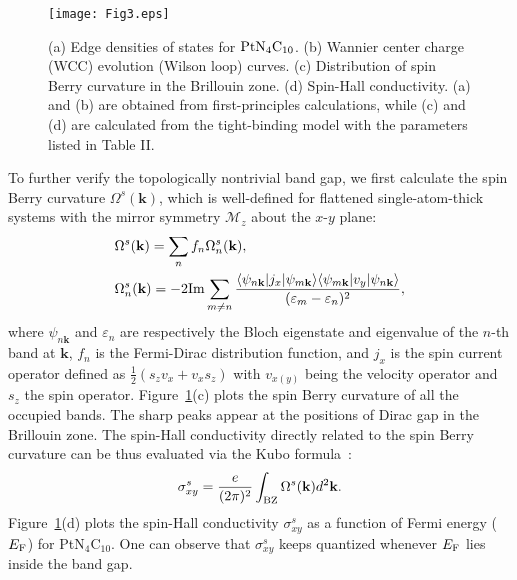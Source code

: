 \documentclass[aps,prl,twocolumn,showpacs,superscriptaddress]{revtex4-1}
\begin{document}
\begin{figure}[tb]
	\texttt{[image: Fig3.eps]}
	\caption{(a) Edge densities of states for ${\rm PtN_4C_{10}}$. (b) Wannier center charge (WCC) evolution (Wilson loop) curves. (c) Distribution of spin Berry curvature in the Brillouin zone. (d) Spin-Hall conductivity. (a) and (b) are obtained from first-principles calculations, while (c) and (d) are calculated from the tight-binding model with the parameters listed in Table II.}
	\label{fig3}
\end{figure}

To further verify the topologically nontrivial band gap, we first calculate the spin Berry curvature $\Omega^s(\textbf{k})$, which is well-defined for flattened single-atom-thick systems with the mirror symmetry $\mathcal{M}_z$ about the $x$-$y$ plane:
\begin{eqnarray}
\begin{aligned}
  &\Omega^s(\textbf{k})=\sum_n f_n\Omega^s_n(\textbf{k}),\\
  &\Omega^s_n(\textbf{k})=-2{\rm Im}\sum_{m\neq n}\frac{\langle{\psi_{n\textbf{k}}}|j_x|\psi_{m\textbf{k}}\rangle{\langle{\psi_{m\textbf{k}}}|v_y|\psi_{n\textbf{k}}\rangle}}{(\varepsilon_m-\varepsilon_n)^2},
  \end{aligned}
\end{eqnarray}
where $\psi_{n\textbf{k}}$ and $\varepsilon_n$ are respectively the Bloch eigenstate and eigenvalue of the $n$-th band at $\textbf{k}$, $f_n$ is the Fermi-Dirac distribution function, and $j_x$ is the spin current operator defined as $\frac12(s_zv_x+v_xs_z)$ with $v_{x(y)}$ being the velocity operator and $s_z$ the spin operator. Figure~\ref{fig3}(c) plots the spin Berry curvature of all the occupied bands. The sharp peaks appear at the positions of Dirac gap in the Brillouin zone. The spin-Hall conductivity directly related to the spin Berry curvature can be thus evaluated via the Kubo formula~\cite {ref48}:
\begin{eqnarray}
\sigma_{xy}^s=\frac{e}{(2\pi)^2}\int_{\rm BZ}\Omega^s(\textbf{k})d^2\textbf{k}.
\end{eqnarray}
Figure~\ref{fig3}(d) plots the spin-Hall conductivity $\sigma_{xy}^s$ as a function of Fermi energy ($E_{\rm F}$) for PtN$_4$C$_{10}$. One can observe that $\sigma_{xy}^s$ keeps quantized whenever $E_{\rm F}$ lies inside the band gap.
\end{document}
